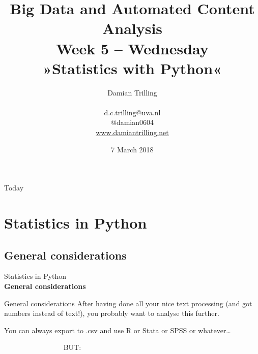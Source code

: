 \documentclass{beamer}
\begin{document}
\title[Big Data and Automated Content Analysis]{\textbf{Big Data and Automated Content Analysis} \\ Week 5 -- Wednesday \\ »Statistics with Python«}
\author[Damian Trilling]{Damian Trilling \\ ~ \\ \footnotesize{d.c.trilling@uva.nl \\@damian0604} \\ \url{www.damiantrilling.net}}
\date{7 March 2018}

\begin{frame}
\titlepage
\end{frame}

\begin{frame}{Today}
\tableofcontents
\end{frame}



\section{Statistics in Python}
\subsection{General considerations}

\begin{frame}[plain]
Statistics in Python\\
\textbf{General considerations}
\end{frame}

\begin{frame}{General considerations}
After having done all your nice text processing (and got numbers instead of text!), you probably want to analyse this further.

You can always export to .csv and use R or Stata or SPSS or whatever\ldots

\vspace{1cm}
\pause

~~~~~~~~~~~~~~~~ \Huge{BUT:}
\end{frame}
\end{document}
